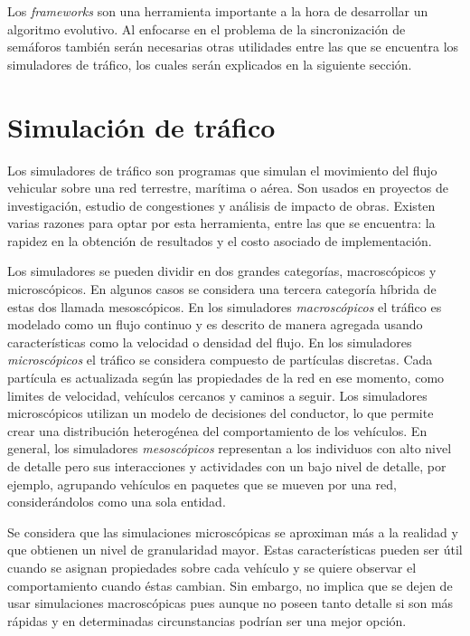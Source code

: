 Los \emph{frameworks} son una herramienta importante a la hora de desarrollar un algoritmo evolutivo. Al enfocarse en el problema de la sincronización de semáforos también serán necesarias otras utilidades entre las que se encuentra los simuladores de tráfico, los cuales serán explicados en la siguiente sección.


\section{Simulación de tráfico}

Los simuladores de tráfico son programas que simulan el movimiento del flujo vehicular sobre una red terrestre, marítima o aérea. Son usados en proyectos de investigación, estudio de congestiones y análisis de impacto de obras.  Existen varias razones para optar por esta herramienta, entre las que se encuentra: la rapidez en la obtención de resultados y el costo asociado de implementación.


Los simuladores se pueden dividir en dos grandes categorías, macroscópicos y microscópicos. En algunos casos se considera una tercera categoría híbrida de estas dos llamada mesoscópicos. En los simuladores \emph{macroscópicos} el tráfico es modelado como un flujo continuo y es descrito de manera agregada usando características como la velocidad o densidad del flujo. En los simuladores \emph{microscópicos} el tráfico se considera compuesto de partículas discretas. Cada partícula es actualizada según las propiedades de la red en ese momento, como limites de velocidad, vehículos cercanos y caminos a seguir. Los simuladores microscópicos utilizan un modelo de decisiones del conductor, lo que permite crear una distribución heterogénea del comportamiento de los vehículos. En general, los simuladores \emph{mesoscópicos} representan a los individuos con alto nivel de detalle pero sus interacciones y actividades con un bajo nivel de detalle, por ejemplo, agrupando vehículos en paquetes que se mueven por una red, considerándolos como una sola entidad.


Se considera que las simulaciones microscópicas se aproximan más a la realidad y que obtienen un nivel de granularidad mayor. Estas características pueden ser útil cuando se asignan propiedades sobre cada vehículo y se quiere observar el comportamiento cuando éstas cambian. Sin embargo, no implica que se dejen de usar simulaciones macroscópicas pues aunque no poseen tanto detalle si son más rápidas y en determinadas circunstancias podrían ser una mejor opción.

